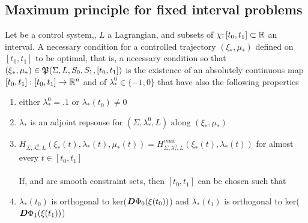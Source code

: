 \subsection{Maximum principle for fixed interval problems}
Let \controlSystem be a control system,, $L$ a Lagrangian, \sz and \so subsets of $\chi;[t_0,t_1]\subset\mathbb{R}$ an interval.
A necessary condition for a controlled trajectory $(\xi_*,\mu_*)$ defined on $[t_0,t_1]$  to be optimal, that is, a necessary condition so that $(\xi_*,\mu_*)\in\mathfrak{P}(\Sigma,L,S_0,S_1,[t_0,t_1])$ is the existence of an absolutely continuous map $[t_0,t_1]:[t_0,t_1]\rightarrow\mathbb{R}^n$ and of  $\lambda_*^0\in\{-1,0\}$ that have also the following properties
\begin{enumerate}
	\item either $\lambda_*^0=.1$ or $\lambda_*(t_0)\ne0$
	\item $\lambda_*$ is an adjoint repsonse for $(\Sigma,\lambda_*^0,L)\text{ along }(\xi_*,\mu_*)$
	\item $H_{\Sigma,\lambda_*^0,L}(\xi_*(t),\lambda_*(t),\mu_*(t))=H_{\Sigma,\lambda_*^0,L}^{max}(\xi_*(t),\lambda_*(t))$ for almost every $t\in[t_0,t_1]$\\\\
	If, \so and \sz are smooth constraint sets, then $[t_0,t_1]$ can be chosen such that 
	\item $\lambda_*(t_0)$ is orthogonal to ker($\boldsymbol{D}\Phi_0(\xi(t_0))$) and $\lambda_*(t_1)$ is orthogonal to ker($\boldsymbol{D}\Phi_1(\xi(t_1))$)
\end{enumerate}

